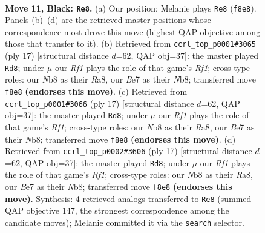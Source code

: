 \documentclass[11pt]{article}
\begin{document}
\clearpage

\begin{figure}[p]\centering
\begin{subfigure}{0.46\textwidth}\centering
\resizebox{\linewidth}{!}{%
\newchessgame
\chessboard[
  setfen={rnb2rk1/1pp1bppp/pn1qp3/4N3/2pP4/4B1P1/PP2PPBP/RN1QR1K1 b - - 1 11},
  showmover=false,
  pgfstyle=straightmove, color=movearrow, markmove={f8-e8}
]}
\caption{}
\end{subfigure}\hfill
\begin{subfigure}{0.46\textwidth}\centering
\resizebox{\linewidth}{!}{%
\newchessgame
\chessboard[
  setfen={rnb2rk1/ppp1bppp/q3pn2/4N3/3P4/6P1/PP2PPBP/RNBQ1RK1 b - - 2 9},
  showmover=false,
  pgfstyle=straightmove, color=movearrow, markmove={f8-d8}
]}
\caption{}
\end{subfigure}
\\[4pt]
\begin{subfigure}{0.46\textwidth}\centering
\resizebox{\linewidth}{!}{%
\newchessgame
\chessboard[
  setfen={rnb2rk1/ppp1bppp/q3pn2/4N3/3P4/6P1/PP2PPBP/RNBQ1RK1 b - - 2 9},
  showmover=false,
  pgfstyle=straightmove, color=movearrow, markmove={f8-d8}
]}
\caption{}
\end{subfigure}\hfill
\begin{subfigure}{0.46\textwidth}\centering
\resizebox{\linewidth}{!}{%
\newchessgame
\chessboard[
  setfen={rnb2rk1/ppp1bppp/q3pn2/4N3/3P4/6P1/PP2PPBP/RNBQ1RK1 b - - 2 9},
  showmover=false,
  pgfstyle=straightmove, color=movearrow, markmove={f8-d8}
]}
\caption{}
\end{subfigure}
\caption{\textbf{Move 11, Black: \texttt{Re8}.} (a) Our position; Melanie plays \texttt{Re8} (\texttt{f8e8}). Panels (b)--(d) are the retrieved master positions whose correspondence most drove this move (highest QAP objective among those that transfer to it). (b) Retrieved from \texttt{ccrl\_top\_p0001\#3065} (ply 17) [structural distance $d$=62, QAP obj=37]: the master played \texttt{Rd8}; under $\mu$ our \emph{Rf1} plays the role of that game's \emph{Rf1}; cross-type roles: our \emph{N}b8 as their \emph{R}a8, our \emph{B}e7 as their \emph{N}b8; transferred move \texttt{f8e8} \textbf{(endorses this move)}. (c) Retrieved from \texttt{ccrl\_top\_p0001\#3066} (ply 17) [structural distance $d$=62, QAP obj=37]: the master played \texttt{Rd8}; under $\mu$ our \emph{Rf1} plays the role of that game's \emph{Rf1}; cross-type roles: our \emph{N}b8 as their \emph{R}a8, our \emph{B}e7 as their \emph{N}b8; transferred move \texttt{f8e8} \textbf{(endorses this move)}. (d) Retrieved from \texttt{ccrl\_top\_p0002\#3606} (ply 17) [structural distance $d$=62, QAP obj=37]: the master played \texttt{Rd8}; under $\mu$ our \emph{Rf1} plays the role of that game's \emph{Rf1}; cross-type roles: our \emph{N}b8 as their \emph{R}a8, our \emph{B}e7 as their \emph{N}b8; transferred move \texttt{f8e8} \textbf{(endorses this move)}. Synthesis: 4 retrieved analogs transferred to \texttt{Re8} (summed QAP objective 147, the strongest correspondence among the candidate moves); Melanie committed it via the \texttt{search} selector.}
\label{fig:thought-m21}
\end{figure}
\end{document}
